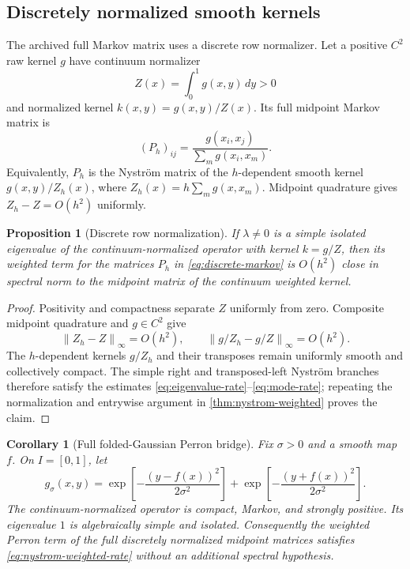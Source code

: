 \documentclass[11pt]{article}
\newtheorem{proposition}[theorem]{Proposition}
\newtheorem{corollary}[theorem]{Corollary}
\theoremstyle{definition}
\theoremstyle{remark}
\newcommand{\norm}[1]{\left\lVert #1\right\rVert}
\begin{document}
\subsection{Discretely normalized smooth kernels}

The archived full Markov matrix uses a discrete row normalizer.  Let a
positive $C^2$ raw kernel $g$ have continuum normalizer
\[
 Z(x)=\int_0^1g(x,y)\,dy>0
\]
and normalized kernel $k(x,y)=g(x,y)/Z(x)$.  Its full midpoint Markov matrix
is
\begin{equation}
 (P_h)_{ij}=\frac{g(x_i,x_j)}{\sum_m g(x_i,x_m)}.
 \label{eq:discrete-markov}
\end{equation}
Equivalently, $P_h$ is the Nystr\"om matrix of the $h$-dependent smooth
kernel $g(x,y)/Z_h(x)$, where
$Z_h(x)=h\sum_mg(x,x_m)$.  Midpoint quadrature gives
$Z_h-Z=O(h^2)$ uniformly.

\begin{proposition}[Discrete row normalization]
\label{prop:discrete-normalization}
If $\lambda\ne0$ is a simple isolated eigenvalue of the continuum-normalized
operator with kernel $k=g/Z$, then its weighted term for the matrices $P_h$
in \eqref{eq:discrete-markov} is $O(h^2)$ close in spectral norm to the
midpoint matrix of the continuum weighted kernel.
\end{proposition}

\begin{proof}
Positivity and compactness separate $Z$ uniformly from zero.  Composite
midpoint quadrature and $g\in C^2$ give
\[
 \norm{Z_h-Z}_\infty=O(h^2),\qquad
 \norm{g/Z_h-g/Z}_\infty=O(h^2).
\]
The $h$-dependent kernels $g/Z_h$ and their transposes remain uniformly
smooth and collectively compact.  The simple right and transposed-left
Nystr\"om branches therefore satisfy the estimates
\eqref{eq:eigenvalue-rate}--\eqref{eq:mode-rate}; repeating the normalization
and entrywise argument in \cref{thm:nystrom-weighted} proves the claim.
\end{proof}

\begin{corollary}[Full folded-Gaussian Perron bridge]
\label{cor:perron}
Fix $\sigma>0$ and a smooth map $f$.  On $I=[0,1]$, let
\begin{equation}
 g_\sigma(x,y)=
 \exp\!\left[-\frac{(y-f(x))^2}{2\sigma^2}\right]
 +
 \exp\!\left[-\frac{(y+f(x))^2}{2\sigma^2}\right].
 \label{eq:folded-kernel}
\end{equation}
The continuum-normalized operator is compact, Markov, and strongly positive.
Its eigenvalue $1$ is algebraically simple and isolated.  Consequently the
weighted Perron term of the full discretely normalized midpoint matrices
satisfies \eqref{eq:nystrom-weighted-rate} without an additional spectral
hypothesis.
\end{corollary}
\end{document}
